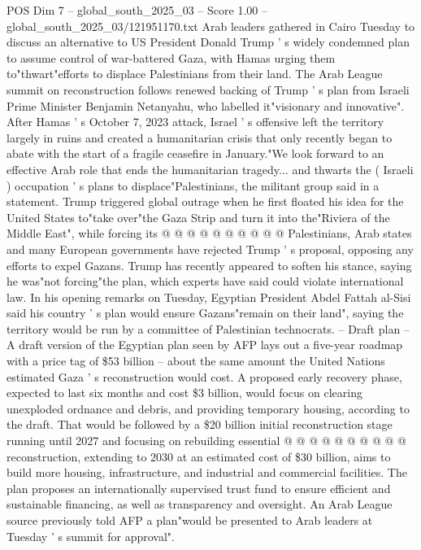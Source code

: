 \begin{textsample}{POS Dim 7 – global\_south\_2025\_03 – Score 1.00 – global\_south\_2025\_03/121951170.txt}  \label{ex:f7_pos_098}
Arab leaders gathered in Cairo Tuesday to discuss an alternative to US President Donald Trump ' s widely condemned plan to assume control of war-battered Gaza, with Hamas urging them to"thwart"efforts to displace Palestinians from their land.
The Arab League summit on reconstruction follows renewed backing of Trump ' s plan from Israeli Prime Minister Benjamin Netanyahu, who labelled it"visionary and innovative".
After Hamas ' s October 7, 2023 attack, Israel ' s offensive left the territory largely in ruins and created a humanitarian crisis that only recently began to abate with the start of a fragile ceasefire in January."We look forward to an effective Arab role that ends the humanitarian tragedy... and thwarts the ( Israeli ) occupation ' s plans to displace"Palestinians, the militant group said in a statement.
Trump triggered global outrage when he first floated his idea for the United States to"take over"the Gaza Strip and turn it into the"Riviera of the Middle East", while forcing its @ @ @ @ @ @ @ @ @ @ Palestinians, Arab states and many European governments have rejected Trump ' s proposal, opposing any efforts to expel Gazans.
Trump has recently appeared to soften his stance, saying he was"not forcing"the plan, which experts have said could violate international law.
In his opening remarks on Tuesday, Egyptian President Abdel Fattah al-Sisi said his country ' s plan would ensure Gazans"remain on their land", saying the territory would be run by a committee of Palestinian technocrats. -- Draft plan -- A draft version of the Egyptian plan seen by AFP lays out a five-year roadmap with a price tag of \$53 billion -- about the same amount the United Nations estimated Gaza ' s reconstruction would cost.
A proposed early recovery phase, expected to last six months and cost \$3 billion, would focus on clearing unexploded ordnance and debris, and providing temporary housing, according to the draft.
That would be followed by a \$20 billion initial reconstruction stage running until 2027 and focusing on rebuilding essential @ @ @ @ @ @ @ @ @ @ reconstruction, extending to 2030 at an estimated cost of \$30 billion, aims to build more housing, infrastructure, and industrial and commercial facilities.
The plan proposes an internationally supervised trust fund to ensure efficient and sustainable financing, as well as transparency and oversight.
An Arab League source previously told AFP a plan"would be presented to Arab leaders at Tuesday ' s summit for approval".

\end{textsample}
